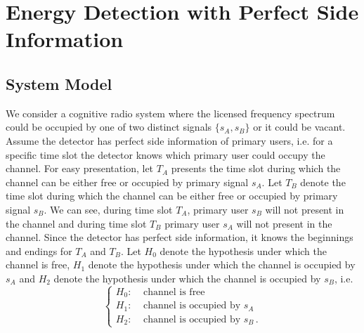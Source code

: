 \section{Energy Detection with Perfect Side Information}
\subsection{System Model}
We consider a cognitive radio system where the licensed frequency spectrum could be occupied by one of two distinct signals $\{s_A, s_B\}$ or it could be vacant. 
Assume the detector has perfect side information of primary users, i.e. for a specific time slot the detector knows which primary user could occupy the channel. For easy presentation, let $T_A$ presents the time slot during which the channel can be either free or occupied by primary signal $s_A$. Let $T_B$ denote the time slot during which the channel can be either free or occupied by primary signal $s_B$. We can see, during time slot $T_A$, primary user $s_B$ will not present in the channel and during time slot $T_B$ primary user $s_A$ will not present in the channel. Since the detector has perfect side information, it knows the beginnings and endings for $T_A$ and $T_B$. Let $H_0$ denote the hypothesis under which the channel is free,  $H_1$ denote the hypothesis under which the channel is occupied by $s_A$ and $H_2$ denote the hypothesis under which the channel is occupied by $s_B$, i.e.
\begin{equation}
\begin{cases}
H_0:\;\;\;\;\text{channel is free}\\
H_1:\;\;\;\;\text{channel is occupied by $s_A$}\\
H_2:\;\;\;\;\text{channel is occupied by $s_B$}\,.
\end{cases}
\end{equation} 

